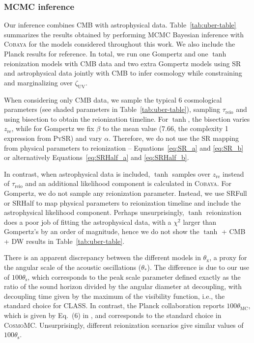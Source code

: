\documentclass[12pt]{article}
\newcommand{\zetaUV}{\zeta_\mathrm{UV}}
\newcommand{\re}{\mathrm{re}}
\newcommand{\reio}{\mathrm{reio}}
\begin{document}
\subsubsection*{MCMC inference}
\label{sec:fits}

Our inference combines CMB with astrophysical data.
Table~\ref{tab:uber-table} summarizes the results obtained by performing MCMC
Bayesian inference with \textsc{Cobaya} for the models considered
throughout this work.
We also include the Planck results \cite{Planck2020a} for reference.
In total, we run one Gompertz and one $\tanh$ reionization models with
CMB data and two extra Gompertz models using SR and astrophysical data
jointly with CMB to infer cosmology while constraining and
marginalizing over $\zetaUV$.

When considering only CMB data, we sample the typical 6 cosmological
parameters (see shaded parameters in Table~\ref{tab:uber-table}), sampling
$\tau_\reio$ and using bisection to obtain the reionization timeline.
For $\tanh$, the bisection varies $z_\re$, while for Gompertz we fix
$\beta$ to the mean value (7.66, the complexity 1 expression from
\textsc{PySR}) and vary $\alpha$.
Therefore, we do not use the SR mapping from physical parameters to
reionization -- Equations~\eqref{eq:SR_a} and \eqref{eq:SR_b} or alternatively
Equations~\eqref{eq:SRHalf_a} and \eqref{eq:SRHalf_b}.

In contrast, when astrophysical data is included, $\tanh$ samples over
$z_\re$ instead of $\tau_\reio$ and an additional likelihood component
is calculated in \textsc{Cobaya}.
For Gompertz, we do not sample any reionization parameter.
Instead, we use SRFull or SRHalf to map physical parameters to
reionization timeline and include the astrophysical likelihood
component.
Perhaps unsurprisingly, $\tanh$ reionization does a poor job of fitting
the astrophysical data, with a $\chi^2$ larger than Gompertz's by an
order of magnitude, hence we do not show the $\tanh$ + CMB + DW results
in Table~\ref{tab:uber-table}.

There is an apparent discrepancy between the different models in
$\theta_\mathrm{x}$, a proxy for the angular scale of the acoustic
oscillations ($\theta_*$).
The difference is due to our use of $100\theta_\mathrm{s}$, which
corresponds to the peak scale parameter defined exactly as the ratio of
the sound horizon divided by the angular diameter at decoupling, with
decoupling time given by the maximum of the visibility function, i.e.,
the standard choice for CLASS.
In contrast, the Planck collaboration reports $100\theta_\mathrm{MC}$,
which is given by Eq.~(6) in \cite{Planck2014}, and corresponds to the
standard choice in \textsc{CosmoMC}\cite{Lewis2002}.
Unsurprisingly, different reionization scenarios give similar values of
$100\theta_\mathrm{s}$.
\end{document}
